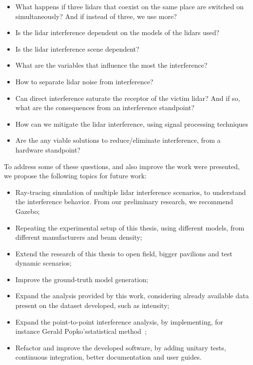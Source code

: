 \begin{itemize}
	\item What happens if three \acp{lidar} that coexist on the same place are switched on simultaneously? And if instead of three, we use more?
	\item Is the \ac{lidar} interference dependent on the models of the \acp{lidar} used?
	\item Is the \ac{lidar} interference scene dependent?
	\item What are the variables that influence the most the interference?
	\item How to separate \ac{lidar} noise from interference?
	\item Can direct interference saturate the receptor of the victim \ac{lidar}? And if so, what are the consequences from an interference standpoint?
	\item How can we mitigate the \ac{lidar} interference, using signal processing techniques
	\item Are the any viable solutions to reduce/eliminate interference, from a hardware standpoint?
\end{itemize}

To address some of these questions, and also improve the work were presented, we propose the following topics for future work:

\begin{itemize}
	\item Ray-tracing simulation of multiple \ac{lidar} interference scenarios, to understand the interference behavior. From our preliminary research, we recommend Gazebo\cp;
	\item Repeating the experimental setup of this thesis, using different models, from different manufacturers and beam density;
	\item Extend the research of this thesis to open field, bigger pavilions and test dynamic scenarios;
	\item Improve the ground-truth model generation;
	\item Expand the analysis provided by this work, considering already available data present on the dataset developed, such as intensity;
	\item Expand the point-to-point interference analysis, by implementing, for instance Gerald Popko's\etal statistical method~\cite{Popko2019b};
	\item Refactor and improve the developed software, by adding unitary tests, continuous integration, better documentation and user guides.
\end{itemize}

